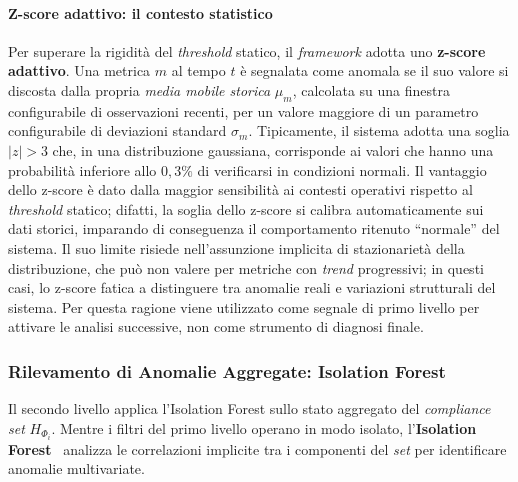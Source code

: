 \paragraph{Z-score adattivo: il contesto statistico}

Per superare la rigidità del \textit{threshold} statico, il \textit{framework} adotta uno
\textbf{z-score adattivo}. Una metrica $m$ al tempo $t$ è segnalata come anomala se il suo valore
si discosta dalla propria \emph{media mobile storica} $\mu_m$, calcolata su una finestra
configurabile di osservazioni recenti, per un valore maggiore di un parametro configurabile di
deviazioni standard $\sigma_m$.
Tipicamente, il sistema adotta una soglia $|z| > 3$ che, in
una distribuzione gaussiana, corrisponde ai valori che hanno una probabilità inferiore allo
$0{,}3\%$ di verificarsi in condizioni normali. Il vantaggio dello z-score è dato dalla
maggior sensibilità ai contesti operativi rispetto al \textit{threshold} statico; difatti, la soglia
dello z-score si calibra automaticamente sui dati storici, imparando di conseguenza il
comportamento ritenuto ``normale'' del sistema. Il suo limite risiede nell'assunzione implicita di
stazionarietà della distribuzione, che può non valere per metriche con \textit{trend} progressivi;
in questi casi, lo z-score fatica a distinguere tra anomalie reali e variazioni strutturali del
sistema. Per questa ragione viene utilizzato come segnale di primo livello per attivare le analisi
successive, non come strumento di diagnosi finale.

\subsubsection{Rilevamento di Anomalie Aggregate: Isolation Forest}
\label{sec:isolation_forest}

Il secondo livello applica l'Isolation Forest sullo stato aggregato del \textit{compliance set}
$H_{\Phi_i}$. Mentre i filtri del primo livello operano in modo isolato, l'\textbf{Isolation
Forest}~\cite{liu2008} analizza le correlazioni implicite tra i componenti del \textit{set} per
identificare anomalie multivariate.

